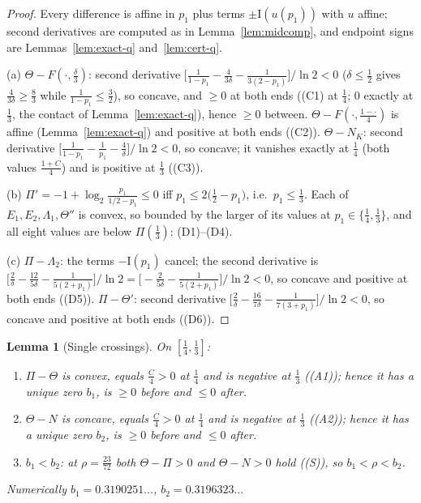 \documentclass[journal]{IEEEtran}
\newtheorem{lemma}{Lemma}
\theoremstyle{definition}
\newcommand{\lgg}{\log_2}
\newcommand{\CC}{C}
\begin{document}
\begin{proof}
Every difference is affine in $p_1$ plus terms $\pm \mathrm I(u(p_1))$ with $u$
affine; second derivatives are computed as in Lemma~\ref{lem:midcomp}, and
endpoint signs are Lemmas~\ref{lem:exact-q} and~\ref{lem:cert-q}.

\textup{(a)} $\Theta-F(\cdot,\tfrac\delta3)$: second derivative
$\bigl[\tfrac1{1-p_1}-\tfrac4{3\delta}-\tfrac1{3(2-p_1)}\bigr]/\ln2<0$
\textup{(}$\delta\le\tfrac12$ gives $\tfrac4{3\delta}\ge\tfrac83$ while
$\tfrac1{1-p_1}\le\tfrac32$\textup{)}, so concave, and $\ge0$ at both ends
\textup{(}\textup{(C1)} at $\tfrac14$; $0$ exactly at $\tfrac13$, the
contact of Lemma~\ref{lem:exact-q}\textup{)}, hence $\ge0$ between.
$\Theta-F(\cdot,\tfrac{1-\cdot}4)$ is affine
(Lemma~\ref{lem:exact-q}) and positive at both ends
\textup{(}\textup{(C2)}\textup{)}. $\Theta-N_K$: second derivative
$\bigl[\tfrac1{1-p_1}-\tfrac1{p_1}-\tfrac4\delta\bigr]/\ln2<0$, so concave;
it vanishes exactly at $\tfrac14$ \textup{(}both values
$\tfrac{1+\CC}4$\textup{)} and is positive at $\tfrac13$
\textup{(}\textup{(C3)}\textup{)}.

\textup{(b)} $\Pi'=-1+\lgg\tfrac{p_1}{1/2-p_1}\le0$ iff
$p_1\le2\bigl(\tfrac12-p_1\bigr)$, i.e.\ $p_1\le\tfrac13$. Each of
$E_1,E_2,\Lambda_1,\Theta''$ is convex, so bounded by the larger of its
values at $p_1\in\{\tfrac14,\tfrac13\}$, and all eight values are below
$\Pi(\tfrac13)$: \textup{(D1)}--\textup{(D4)}.

\textup{(c)} $\Pi-\Lambda_2$: the terms $-\mathrm I(p_1)$ cancel; the second
derivative is
$\bigl[\tfrac2\delta-\tfrac{12}{5\delta}-\tfrac1{5(2+p_1)}\bigr]/\ln2
=\bigl[-\tfrac2{5\delta}-\tfrac1{5(2+p_1)}\bigr]/\ln2<0$, so concave and
positive at both ends \textup{(}\textup{(D5)}\textup{)}. $\Pi-\Theta'$:
second derivative
$\bigl[\tfrac2\delta-\tfrac{16}{7\delta}-\tfrac1{7(3+p_1)}\bigr]/\ln2<0$,
so concave and positive at both ends \textup{(}\textup{(D6)}\textup{)}.
\end{proof}

\begin{lemma}[Single crossings]\label{lem:cross-q}
On $[\tfrac14,\tfrac13]$:
\begin{enumerate}
\item[\textup{(i)}] $\Pi-\Theta$ is convex, equals $\tfrac{\CC}4>0$ at
$\tfrac14$ and is negative at $\tfrac13$
\textup{(}\textup{(A1)}\textup{)}; hence it has a unique zero $b_1$, is
$\ge0$ before and $\le0$ after.
\item[\textup{(ii)}] $\Theta-N$ is concave, equals $\tfrac{\CC}4>0$ at
$\tfrac14$ and is negative at $\tfrac13$
\textup{(}\textup{(A2)}\textup{)}; hence it has a unique zero $b_2$, is
$\ge0$ before and $\le0$ after.
\item[\textup{(iii)}] $b_1<b_2$: at $\rho=\tfrac{23}{72}$ both
$\Theta-\Pi>0$ and $\Theta-N>0$ hold \textup{(}\textup{(S)}\textup{)},
so $b_1<\rho<b_2$.
\end{enumerate}
Numerically $b_1=0.3190251\ldots$, $b_2=0.3196323\ldots$
\end{lemma}
\end{document}
